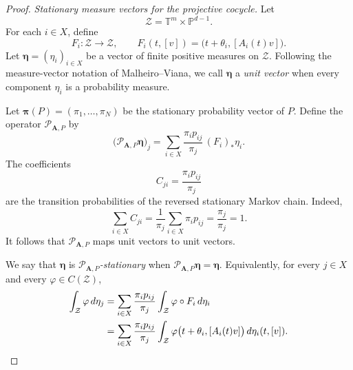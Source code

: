 \documentclass[11pt,a4paper]{amsart}
\newcommand{\T}{\mathbb T}
\newcommand{\PP}{\mathbb P}
\begin{document}
\begin{proof}
\noindent\emph{Stationary measure vectors for the projective
cocycle.}
Let
\[
 \mathcal Z=\T^m\times\PP^{d-1}.
\]
For each \(i\in X\), define
\[
 F_i:\mathcal Z\longrightarrow\mathcal Z,
 \qquad
 F_i(t,[v])
 =
 \bigl(t+\theta_i,[A_i(t)v]\bigr).
\]
Let $\boldsymbol\eta=(\eta_i)_{i\in X}$ be a vector of finite positive measures on \(\mathcal Z\).  Following
the measure-vector notation of Malheiro--Viana, we call
\(\boldsymbol\eta\) a \emph{unit vector} when every component
\(\eta_i\) is a probability measure.

Let $\boldsymbol\pi(P)=(\pi_1,\ldots,\pi_N)$
be the stationary probability vector of \(P\).  Define the operator \(\mathcal P_{\mathbf A,P}\) by
\begin{equation}\label{eq:projective-measure-vector-operator}
 \bigl(\mathcal P_{\mathbf A,P}\boldsymbol\eta\bigr)_j
 =
 \sum_{i\in X}
 \frac{\pi_i p_{ij}}{\pi_j}\,(F_i)_*\eta_i.
\end{equation}
The coefficients
\[
 C_{ji}
 =
 \frac{\pi_i p_{ij}}{\pi_j}
\]
are the transition probabilities of the reversed stationary Markov
chain.  Indeed,
\[
 \sum_{i\in X}C_{ji}
 =
 \frac{1}{\pi_j}\sum_{i\in X}\pi_i p_{ij}
 =
 \frac{\pi_j}{\pi_j}
 =
 1.
\]
It follows that \(\mathcal P_{\mathbf A,P}\) maps unit vectors to unit
vectors.

We say that \(\boldsymbol\eta\) is
\emph{\(\mathcal P_{\mathbf A,P}\)-stationary} when
$
 \mathcal P_{\mathbf A,P}\boldsymbol\eta
 =
 \boldsymbol\eta.
$
Equivalently, for every \(j\in X\) and every
\(\varphi\in C(\mathcal Z)\),
\begin{align}
 \int_{\mathcal Z}\varphi\,d\eta_j
 &=
 \sum_{i\in X}
 \frac{\pi_i p_{ij}}{\pi_j}
 \int_{\mathcal Z}\varphi\circ F_i\,d\eta_i
 \notag\\
 &=
 \sum_{i\in X}
 \frac{\pi_i p_{ij}}{\pi_j}
 \int_{\mathcal Z}
 \varphi\bigl(t+\theta_i,[A_i(t)v]\bigr)
 \,d\eta_i(t,[v]).
 \label{eq:projective-stationary-vector-integral}
\end{align}



\end{proof}
\end{document}
